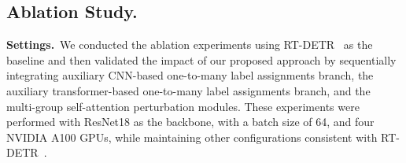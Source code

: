 \documentclass[10pt,twocolumn,letterpaper]{article}
\begin{document}
%




\subsection{Ablation Study.}

\textbf{Settings.}~We conducted the ablation experiments using RT-DETR~\cite{zhao2024rt-detr} as the baseline and then validated the impact of our proposed approach by sequentially integrating auxiliary CNN-based one-to-many label assignments branch, the auxiliary transformer-based one-to-many label assignments branch, and the multi-group self-attention perturbation modules. These experiments were performed with ResNet18 as the backbone, with a batch size of 64, and four NVIDIA A100 GPUs, while maintaining other configurations consistent with RT-DETR~\cite{zhao2024rt-detr}.
\end{document}
